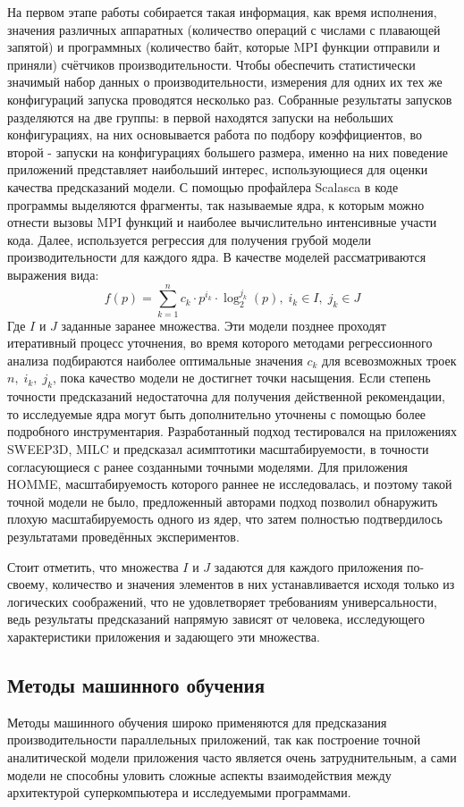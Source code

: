 		На первом этапе работы собирается такая информация, как время исполнения, значения различных аппаратных (количество операций с числами с плавающей запятой) и программных (количество байт, которые MPI функции отправили и приняли) счётчиков производительности. Чтобы обеспечить статистически значимый набор данных о производительности, измерения для одних их тех же конфигураций запуска проводятся несколько раз. Собранные результаты запусков разделяются на две группы: в первой находятся запуски на небольших конфигурациях, на них основывается работа по подбору коэффициентов, во второй - запуски на конфигурациях большего размера, именно на них поведение приложений представляет наибольший интерес, использующиеся для оценки качества предсказаний модели. С помощью профайлера Scalasca в коде программы выделяются фрагменты, так называемые ядра, к которым можно отнести вызовы MPI функций и наиболее вычислительно интенсивные участи кода. Далее, используется регрессия для получения грубой модели производительности для каждого ядра. В качестве моделей рассматриваются выражения вида:
		\[
		f(p) = \sum \limits_{k=1}^{n} c_k \cdot p^{i_k} \cdot \log_2^{j_k}(p),\; i_k \in I,\; j_k \in J 
		\]
		Где \(I\) и \(J\) заданные заранее множества. Эти модели позднее проходят итеративный процесс уточнения, во время которого методами регрессионного анализа подбираются наиболее оптимальные значения \(c_k\) для всевозможных троек \(n,\;i_{k},\;j_{k}\), пока качество модели не достигнет точки насыщения. Если степень точности предсказаний недостаточна для получения действенной рекомендации, то исследуемые ядра могут быть дополнительно уточнены с помощью более подробного инструментария. Разработанный подход тестировался на приложениях SWEEP3D, MILC и предсказал асимптотики масштабируемости, в точности согласующиеся с ранее созданными точными моделями. Для приложения HOMME, масштабируемость которого раннее не исследовалась, и поэтому такой точной модели не было, предложенный авторами подход позволил обнаружить плохую масштабируемость одного из ядер, что затем полностью подтвердилось результатами проведённых экспериментов.

		Стоит отметить, что множества \(I\) и \(J\) задаются для каждого приложения по-своему, количество и значения элементов в них устанавливается исходя только из логических соображений, что не удовлетворяет требованиям универсальности, ведь результаты предсказаний напрямую зависят от человека, исследующего характеристики приложения и задающего эти множества.


	\subsection{Методы машинного обучения}
		Методы машинного обучения широко применяются для предсказания производительности параллельных приложений, так как построение точной аналитической модели приложения часто является очень затруднительным, а сами модели не способны уловить сложные аспекты взаимодействия между архитектурой суперкомпьютера и исследуемыми программами.

